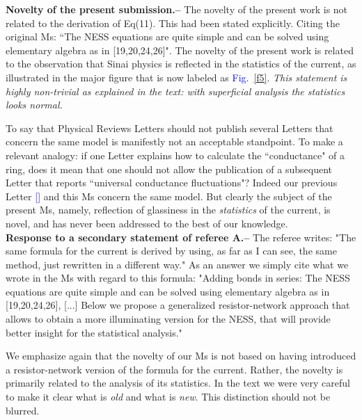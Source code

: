 \documentclass[aps,prl,floats,floatfix,twocolumn]{revtex4}
\newcommand{\sect}[1]{{\bf #1.-- }}
\newcommand{\Fig}[1]{\textcolor{blue}{Fig.}\!\!~\ref{#1}}
\renewcommand{\cite}[1]{\textcolor{blue}{[\onlinecite{#1}}]} %
\begin{document}
\sect{Novelty of the present submission}
%
The novelty of the present work is not related to the derivation of Eq(11).  This had been stated explicitly. Citing the original Ms: \textsf{``The NESS equations are quite simple and can be solved using elementary algebra as in [19,20,24,26]".}
%
The novelty of the present work is related to the observation that Sinai physics is reflected in the statistics of the current, as illustrated in the major figure that is now labeled as \Fig{f5}. {\em This statement is highly non-trivial as explained in the text: with superficial analysis the statistics looks normal.}

To say that Physical Reviews Letters should not publish several Letters that concern the same model is manifestly not an acceptable standpoint. To make a relevant analogy: if one Letter explains how to calculate the  ``conductance" of a ring, does it mean that one should not allow the publication of a subsequent Letter that reports ``universal conductance fluctuations"?
Indeed our previous Letter \cite{ner} and this Ms concern the same model. But clearly the subject of the present Ms, namely, reflection of glassiness in the {\em statistics} of the current, is novel, and has never been addressed to the best of our knowledge. \\


\sect{Response to a secondary statement of referee A}
%
The referee writes:
\textsf{"The same formula for the current is derived by using, as far as I can see, the same method, just rewritten in a different way."}
%
As an answer we simply cite what we wrote in the Ms with regard to this formula: 
\textsf{"Adding bonds in series: The NESS equations are quite simple and can be solved using elementary algebra as in [19,20,24,26], [...] Below we propose a generalized resistor-network approach that allows to obtain a more illuminating version for the NESS, that will provide better insight for the statistical analysis."}

We emphasize again that the novelty of our Ms is not based on having  
introduced a resistor-network version of the formula for the current.
Rather, the novelty is primarily related to the analysis of its statistics.
In the text we were very careful to make it clear what is {\em old} 
and what is {\em new}. This distinction should not be blurred. \\
\end{document}
